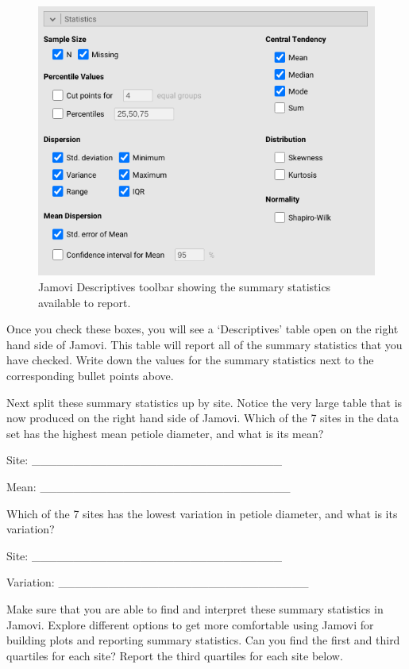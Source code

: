 \documentclass[
]{scrbook}
\begin{document}
\begin{figure}
\includegraphics[width=1\linewidth]{img/lilypad_summary_statistics} \caption{Jamovi Descriptives toolbar showing the summary statistics available to report.}\label{fig:unnamed-chunk-49}
\end{figure}

Once you check these boxes, you will see a `Descriptives' table open on the right hand side of Jamovi.
This table will report all of the summary statistics that you have checked.
Write down the values for the summary statistics next to the corresponding bullet points above.

Next split these summary statistics up by site.
Notice the very large table that is now produced on the right hand side of Jamovi.
Which of the 7 sites in the data set has the highest mean petiole diameter, and what is its mean?

Site: \_\_\_\_\_\_\_\_\_\_\_\_\_\_\_\_\_\_\_\_\_\_\_\_\_\_\_\_\_\_

Mean: \_\_\_\_\_\_\_\_\_\_\_\_\_\_\_\_\_\_\_\_\_\_\_\_\_\_\_\_\_\_

Which of the 7 sites has the lowest variation in petiole diameter, and what is its variation?

Site: \_\_\_\_\_\_\_\_\_\_\_\_\_\_\_\_\_\_\_\_\_\_\_\_\_\_\_\_\_\_

Variation: \_\_\_\_\_\_\_\_\_\_\_\_\_\_\_\_\_\_\_\_\_\_\_\_\_\_\_\_\_\_

Make sure that you are able to find and interpret these summary statistics in Jamovi.
Explore different options to get more comfortable using Jamovi for building plots and reporting summary statistics.
Can you find the first and third quartiles for each site?
Report the third quartiles for each site below.
\end{document}
